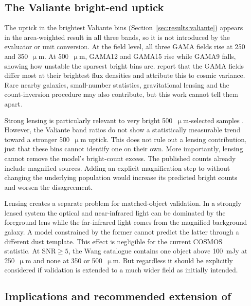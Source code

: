 \documentclass[12pt,a4paper]{article}
\begin{document}
\subsection{The Valiante bright-end uptick}
\label{sec:discussion:valiante}

The uptick in the brightest Valiante bins (Section~\ref{sec:results:valiante}) appears
in the area-weighted result in all three bands, so it is not introduced by the evaluator
or unit conversion. At the field level, all three GAMA fields rise at 250 and
350~$\upmu$m. At 500~$\upmu$m, GAMA12 and GAMA15 rise while GAMA9 falls, showing how
unstable the sparsest bright bins are. \citet{Valiante_2016} report that the GAMA fields
differ most at their brightest flux densities and attribute this to cosmic variance.
Rare nearby galaxies, small-number statistics, gravitational lensing and the count-inversion procedure may also contribute, but this work cannot tell them apart.

Strong lensing is particularly relevant to very bright 500~$\upmu$m-selected samples
\citep{Wardlow_2013,Negrello_2017}. However, the Valiante band ratios do not show a
statistically measurable trend toward a stronger 500~$\upmu$m uptick. This does not rule
out a lensing contribution, just that these bins cannot identify one on their own.
More importantly, lensing cannot remove the model's bright-count excess. The published
counts already include magnified sources. Adding an explicit magnification step to
\popcosmos{} without changing the underlying population would increase its predicted
bright counts and worsen the disagreement.

Lensing creates a separate problem for matched-object validation. In a
strongly lensed system the optical and near-infrared light can be dominated by the
foreground lens while the far-infrared light comes from the magnified background
galaxy. A model constrained by the former cannot predict the latter through a different
dust template. This effect is negligible for the current COSMOS statistic. At
$\mathrm{SNR}\geq5$, the Wang catalogue contains one object above \SI{100}{mJy} at
250~$\upmu$m and none at 350 or 500~$\upmu$m. But regardless it should be
explicitly considered if validation is extended to a much wider field as initially intended. 


\subsection{Implications and recommended extension of \popcosmos{}}
\label{sec:discussion:recommendations}
\end{document}
